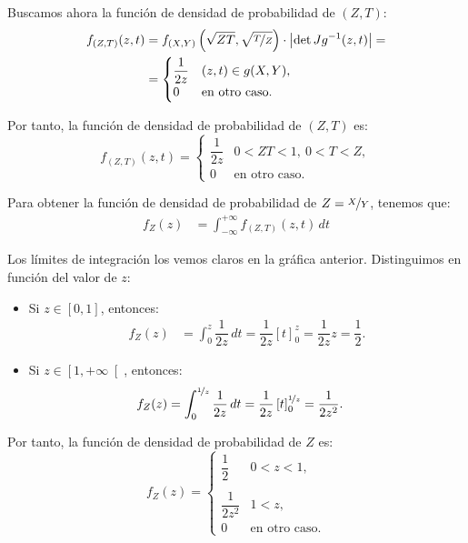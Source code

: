\begin{ejercicio}
\begin{enumerate}
        Buscamos ahora la función de densidad de probabilidad de $(Z,T)$:
        \begin{align*}
            f_{(Z,T)}(z, t)&=f_{(X,Y)}\left(\sqrt{ZT},\sqrt{\nicefrac{T}{Z}}\right)\cdot \left|\det Jg^{-1}(z,t)\right|
            =\\&= \begin{cases}
                \dfrac{1}{2z} & (z,t)\in g(X,Y), \\
                0 & \text{en otro caso}.
            \end{cases}
        \end{align*}

        Por tanto, la función de densidad de probabilidad de $(Z,T)$ es:
        \begin{equation*}
            f_{(Z,T)}(z, t) = \begin{cases}
                \dfrac{1}{2z} & 0<ZT<1,~0<T<Z, \\
                0 & \text{en otro caso}.
            \end{cases}
        \end{equation*}

        Para obtener la función de densidad de probabilidad de $Z=\nicefrac{X}{Y}$, tenemos que:
        \begin{align*}
            f_{Z}(z)&=\int_{-\infty}^{+\infty} f_{(Z,T)}(z, t) \, dt
        \end{align*}

        Los límites de integración los vemos claros en la gráfica anterior. Distinguimos en función del valor de $z$:
        \begin{itemize}
            \item Si $z\in [0,1]$, entonces:
            \begin{align*}
                f_Z(z)&=\int_{0}^{z} \dfrac{1}{2z} \, dt = \dfrac{1}{2z}\left[t\right]_{0}^{z} = \dfrac{1}{2z}z = \dfrac{1}{2}.
            \end{align*}

            \item Si $z\in \left[1,+\infty\right[$, entonces:
            \begin{align*}
                f_Z(z)&=\int_{0}^{\nicefrac{1}{z}} \dfrac{1}{2z} \, dt = \dfrac{1}{2z}\left[t\right]_{0}^{\nicefrac{1}{z}} = \dfrac{1}{2z^2}.
            \end{align*}
        \end{itemize}

        Por tanto, la función de densidad de probabilidad de $Z$ es:
        \begin{equation*}
            f_Z(z) = \begin{cases}
                \dfrac{1}{2} & 0<z<1, \\ \\
                \dfrac{1}{2z^2} & 1<z, \\
                0 & \text{en otro caso}.
            \end{cases}
        \end{equation*}


\end{enumerate}
\end{ejercicio}
